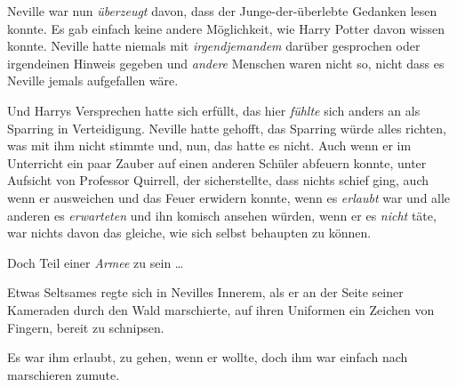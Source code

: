Neville war nun \emph{überzeugt} davon, dass der Junge-der-überlebte Gedanken lesen konnte. Es gab einfach keine andere Möglichkeit, wie Harry Potter davon wissen konnte. Neville hatte niemals mit \emph{irgendjemandem} darüber gesprochen oder irgendeinen Hinweis gegeben und \emph{andere} Menschen waren nicht so, nicht dass es Neville jemals aufgefallen wäre.

Und Harrys Versprechen hatte sich erfüllt, das hier \emph{fühlte} sich anders an als Sparring in Verteidigung. Neville hatte gehofft, das Sparring würde alles richten, was mit ihm nicht stimmte und, nun, das hatte es nicht. Auch wenn er im Unterricht ein paar Zauber auf einen anderen Schüler abfeuern konnte, unter Aufsicht von Professor Quirrell, der sicherstellte, dass nichts schief ging, auch wenn er ausweichen und das Feuer erwidern konnte, wenn es \emph{erlaubt} war und alle anderen es \emph{erwarteten} und ihn komisch ansehen würden, wenn er es \emph{nicht} täte, war nichts davon das gleiche, wie sich selbst behaupten zu können.

Doch Teil einer \emph{Armee} zu sein …

Etwas Seltsames regte sich in Nevilles Innerem, als er an der Seite seiner Kameraden durch den Wald marschierte, auf ihren Uniformen ein Zeichen von Fingern, bereit zu schnipsen.

Es war ihm erlaubt, zu gehen, wenn er wollte, doch ihm war einfach nach marschieren zumute.

